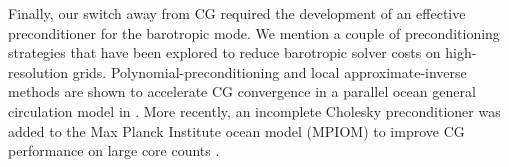 Finally, our switch away from CG required the development of an effective preconditioner for the barotropic mode.  
We mention a couple of preconditioning strategies that have been explored to reduce barotropic solver costs on high-resolution grids.  
Polynomial-preconditioning and local appr\-oximate-inverse methods are shown to accelerate CG convergence in a parallel ocean general circulation model in \cite{smith1992parallel}. 
More recently, an incomplete Cholesky preconditioner was added to the Max Planck Institute ocean model (MPIOM) to improve CG performance on large core counts \cite{adamidis2011high}. 






